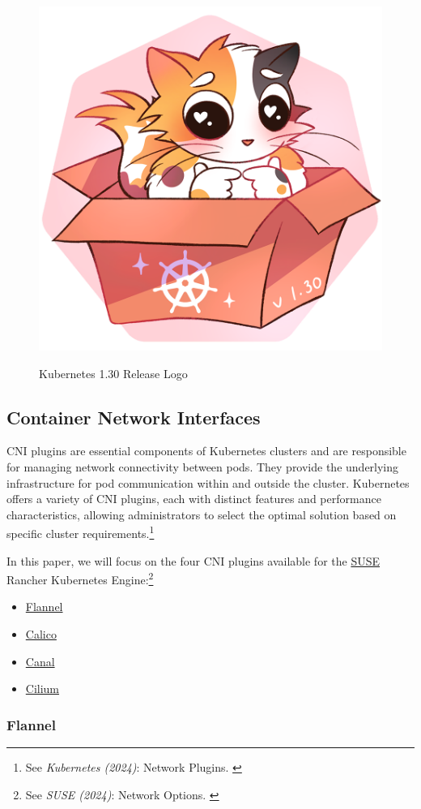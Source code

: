 \begin{figure}[H]
\centering
\caption {Kubernetes 1.30 Release Logo}
\includegraphics[width=0.3\linewidth]{images/k8s-1.30.png}
\label{fig:uwubernetes}
\end{figure}

\subsection{Container Network Interfaces}

CNI plugins are essential components of Kubernetes clusters and are responsible for managing network connectivity between pods. They provide the underlying infrastructure for pod communication within and outside the cluster. Kubernetes offers a variety of CNI plugins, each with distinct features and performance characteristics, allowing administrators to select the optimal solution based on specific cluster requirements.\footnote{See \textit{Kubernetes (2024)}: Network Plugins. \cite{networkPlugin}}

In this paper, we will focus on the four CNI plugins available for the \href{https://www.suse.com/}{SUSE} Rancher Kubernetes Engine:\footnote{See \textit{SUSE (2024)}: Network Options. \cite{networkOptions}}

\begin{itemize}
    \item \href{https://github.com/flannel-io/flannel}{Flannel}
    \item \href{https://www.tigera.io/project-calico/}{Calico}
    \item \href{https://docs.tigera.io/calico/latest/getting-started/kubernetes/flannel/install-for-flannel#installing-calico-for-policy-and-flannel-aka-canal-for-networking}{Canal}
    \item \href{https://github.com/cilium/cilium}{Cilium}
\end{itemize}

\subsubsection{Flannel}

